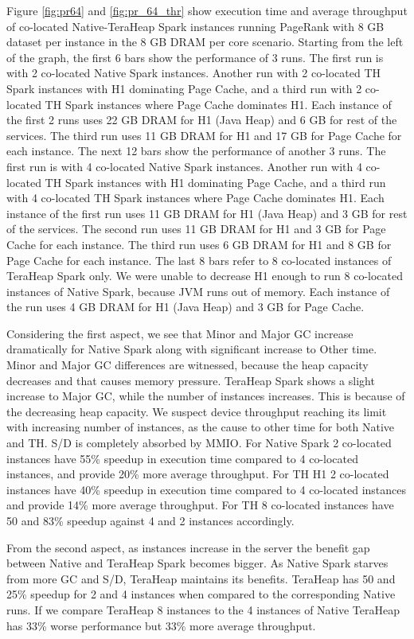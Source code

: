 Figure \ref{fig:pr64} and \ref{fig:pr_64_thr} show execution time and average throughput of co-located
Native-TeraHeap Spark instances running PageRank with 8 GB
dataset per instance in the 8 GB DRAM per core scenario.
Starting from the left of the graph, the first 6 bars show the
performance of 3 runs. The first run is with 2 co-located Native Spark instances.
Another run with 2 co-located TH Spark instances with H1 dominating Page Cache,
and a third run with 2 co-located TH Spark instances where Page Cache dominates H1.
Each instance of the first 2 runs uses 22 GB DRAM for H1 (Java Heap) and 6 GB for rest of the services.
The third run uses 11 GB DRAM for H1 and 17 GB for Page Cache for each instance. 
The next 12 bars show the performance of another 3 runs. The first run is with 4 co-located Native Spark instances.
Another run with 4 co-located TH Spark instances with H1 dominating Page Cache,
and a third run with 4 co-located TH Spark instances where Page Cache dominates H1.
Each instance of the first run uses 11 GB DRAM for H1 (Java Heap) and 3 GB for rest of the services.
The second run uses 11 GB DRAM for H1 and 3 GB for Page Cache for each instance.
The third run uses 6 GB DRAM for H1 and 8 GB for Page Cache for each instance.
The last 8 bars refer to 8 co-located instances of TeraHeap Spark only. 
We were unable to decrease H1 enough to run 8 co-located instances of Native Spark,
because JVM runs out of memory. Each instance of the run uses 4 GB DRAM for H1 (Java Heap) and 3 GB for Page Cache.

Considering the first aspect, we see that Minor and Major GC increase dramatically for Native Spark along with significant increase to Other time. Minor and Major GC differences are witnessed, because the heap capacity decreases and that causes memory pressure. TeraHeap Spark shows a slight increase to Major GC, while the number of instances increases. This is because of the decreasing heap capacity. We suspect device throughput reaching its limit with increasing number of instances, as the cause to other time for both Native and TH. S/D is completely absorbed by MMIO. For Native Spark 2 co-located instances have 55\% speedup in execution time compared to 4 co-located instances, and provide 20\% more average throughput. For TH H1 2 co-located instances have 40\% speedup in execution time compared to 4 co-located instances and provide 14\% more average throughput. For TH 8 co-located instances have 50 and 83\% speedup against 4 and 2 instances accordingly.

From the second aspect, as instances increase in the server the benefit gap between Native and TeraHeap Spark becomes bigger. As Native Spark starves from more GC and S/D, TeraHeap maintains its benefits. TeraHeap has 50 and 25\% speedup for 2 and 4 instances when compared to the corresponding Native runs. If we compare TeraHeap 8 instances to the 4 instances of Native TeraHeap has 33\% worse performance but 33\% more average throughput.

